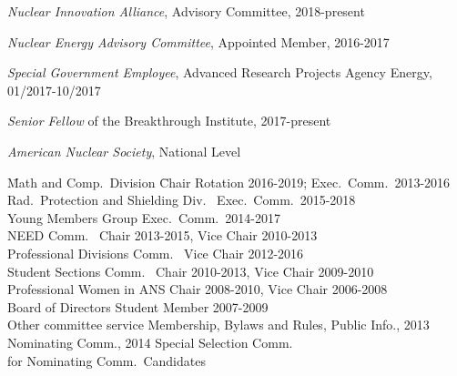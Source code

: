 \textit{Nuclear Innovation Alliance}, Advisory Committee, 2018-present

\textit{Nuclear Energy Advisory Committee}, Appointed Member, 2016-2017

\textit{Special Government Employee}, Advanced Research Projects Agency Energy, 01/2017-10/2017

\textit{Senior Fellow} of the Breakthrough Institute, 2017-present

\textit{American Nuclear Society}, National Level
\begin{tabbing}
\hspace*{2 em}\= Math and Comp.\ Division \hspace*{6em} \= Chair Rotation 2016-2019; Exec.\ Comm.\ 2013-2016 \\
%
\> Rad.\ Protection and Shielding Div.\ \> Exec.\ Comm.\ 2015-2018\\
%
\> Young Members Group \> Exec.\ Comm.\ 2014-2017\\
%
\> NEED Comm.\ \> Chair 2013-2015, Vice Chair 2010-2013\\
%
\> Professional Divisions Comm.\ \> Vice Chair 2012-2016 \\
%
\> Student Sections Comm.\ \> Chair 2010-2013, Vice Chair 2009-2010\\
%
\> Professional Women in ANS \> Chair 2008-2010, Vice Chair 2006-2008\\	
%
\> Board of Directors \> Student Member 2007-2009\\
%
\> Other committee service \>	Membership, Bylaws and Rules, Public Info., 2013 \\ \> \> Nominating Comm., 2014 Special Selection Comm.\ \\ \> \> for Nominating Comm.\ Candidates
\end{tabbing}

